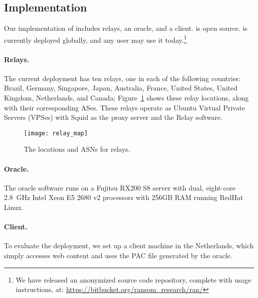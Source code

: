 \subsection{Implementation}

Our implementation of \system{} includes relays, an oracle, and 
a client. \system{} is open source.  \system{} is currently deployed globally, and
any user may use it today.\footnote{We have released an anonymized source code repository,
complete with usage instructions, at: \url{https://bitbucket.org/ransom_research/ran/}}

\paragraph{Relays.}  The current deployment has ten relays, one in each
of the following
countries: Brazil,  Germany, Singapore, Japan, Australia, France, United
States, United Kingdom, Netherlands, and Canada; Figure~\ref{fig:relay_locations}
shows these relay locations, along with their corresponding ASes. These relays operate
as Ubuntu Virtual Private Servers (VPSes) with Squid as the proxy
server and the \system{} Relay software.

\begin{figure}[t!]
\centering
\texttt{[image: relay\_map]}
\caption{The locations and ASNs for \system{} relays.}
\label{fig:relay_locations}
\end{figure}

\paragraph{Oracle.}  The oracle software runs on a Fujitsu RX200 S8 server with dual, 
eight-core 2.8~GHz Intel Xeon E5 2680 v2 processors with 256GB RAM running 
RedHat Linux. 

\paragraph{Client.} To evaluate the \system{} deployment, we set up a client 
machine in the Netherlands, which simply accesses web content and uses the PAC 
file generated by the oracle. 
